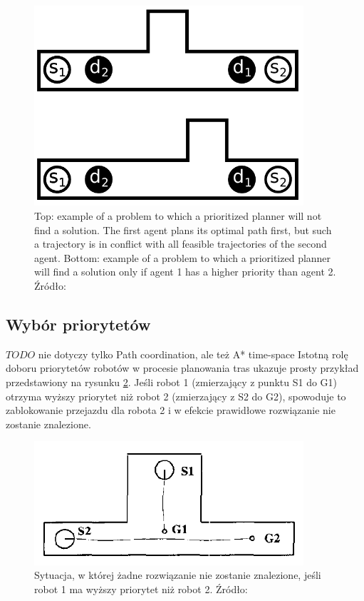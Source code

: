 \begin{figure}[H]
	\centering
	\includegraphics[width=10cm]{img/prioritized-planning-problem1}
	\caption{Top: example of a problem to which a prioritized planner
will not find a solution. The first agent plans its optimal path first,
but such a trajectory is in conflict with all feasible trajectories of the
second agent. Bottom: example of a problem to which a prioritized
planner will find a solution only if agent 1 has a higher priority than
agent 2. Źródło: \cite{async_decentralized_spacetime_cp}}
	\label{fig:img_prioritized-planning-problem1}
\end{figure}

\subsection{Wybór priorytetów}
$TODO$ nie dotyczy tylko Path coordination, ale też A* time-space
Istotną rolę doboru priorytetów robotów w procesie planowania tras ukazuje prosty przykład przedstawiony na rysunku \ref{fig:image_article1_fig1}. Jeśli robot 1 (zmierzający z punktu S1 do G1) otrzyma wyższy priorytet niż robot 2 (zmierzający z S2 do G2), spowoduje to zablokowanie przejazdu dla robota 2 i w efekcie prawidłowe rozwiązanie nie zostanie znalezione.
\begin{figure}[H]
	\centering
	\includegraphics[width=10cm]{img/article1/fig1}
	\caption{Sytuacja, w której żadne rozwiązanie nie zostanie znalezione, jeśli robot 1 ma wyższy priorytet niż robot 2. Źródło: \cite{optpriorities}}
	\label{fig:image_article1_fig1}
\end{figure}

